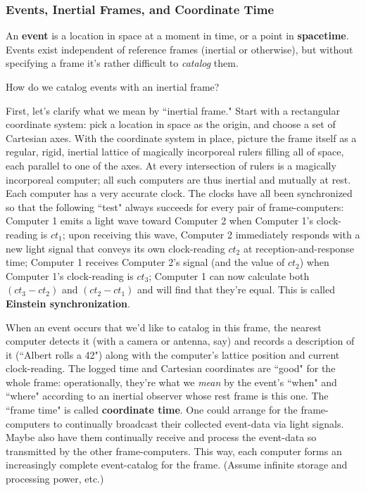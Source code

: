\documentclass[12pt]{article}
\begin{document}
\subsubsection{Events, Inertial Frames, and Coordinate Time}\label{sssec:events}

An \textbf{event} is a location in space at a moment in time, or a point in \textbf{spacetime}. Events exist independent of reference frames (inertial or otherwise), but without specifying a frame it's rather difficult to \emph{catalog} them.

How do we catalog events with an inertial frame?

First, let's clarify what we mean by ``inertial frame." Start with a rectangular coordinate system: pick a location in space as the origin, and choose a set of Cartesian axes. With the coordinate system in place, picture the frame itself as a regular, rigid, inertial lattice of magically incorporeal rulers filling all of space, each parallel to one of the axes. At every intersection of rulers is a magically incorporeal computer; all such computers are thus inertial and mutually at rest. Each computer has a very accurate clock. The clocks have all been synchronized so that the following ``test" always succeeds for every pair of frame-computers: Computer 1 emits a light wave toward Computer 2 when Computer 1's clock-reading is $ct_1$; upon receiving this wave, Computer 2 immediately responds with a new light signal that conveys its own clock-reading $ct_2$ at reception-and-response time; Computer 1 receives Computer 2's signal (and the value of $ct_2$) when Computer 1's clock-reading is $ct_3$; Computer 1 can now calculate both $(ct_3 - ct_2)$ and $(ct_2 - ct_1)$ and will find that they're equal. This is called \textbf{Einstein synchronization}.

When an event occurs that we'd like to catalog in this frame, the nearest computer detects it (with a camera or antenna, say) and records a description of it (``Albert rolls a 42") along with the computer's lattice position and current clock-reading. The logged time and Cartesian coordinates are ``good" for the whole frame: operationally, they're what we \emph{mean} by the event's ``when" and ``where" according to an inertial observer whose rest frame is this one. The ``frame time" is called \textbf{coordinate time}. One could arrange for the frame-computers to continually broadcast their collected event-data via light signals. Maybe also have them continually receive and process the event-data so transmitted by the other frame-computers. This way, each computer forms an increasingly complete event-catalog for the frame. (Assume infinite storage and processing power, etc.)
\end{document}
